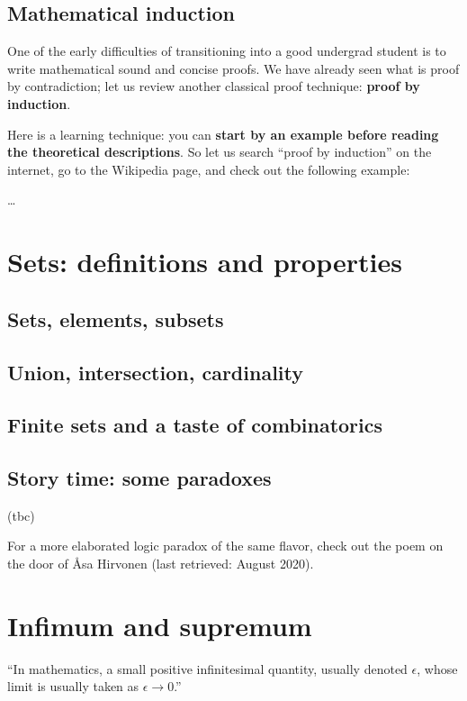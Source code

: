 \documentclass[
	fontsize=10pt, %
	twoside=true, %
	secnumdepth=1, %
	numbers=noenddot, %
]{kaobook}
\begin{document}
\section{Mathematical induction}
One of the early difficulties of transitioning into a good undergrad student is to write mathematical sound and concise proofs. We have already seen what is proof by contradiction; let us review another classical proof technique: \textbf{proof by induction}.

Here is a learning technique: you can \textbf{start by an example before reading the theoretical descriptions}. So let us search ``proof by induction'' on the internet, go to the Wikipedia page, and check out the following example:

\begin{example}
\dots
\end{example}


\chapter{Sets: definitions and properties}

\section{Sets, elements, subsets}

\section{Union, intersection, cardinality}

\section{Finite sets and a taste of combinatorics}

\section{Story time: some paradoxes}

(tbc)

For a more elaborated logic paradox of the same flavor, check out the poem on the door of Åsa Hirvonen (last retrieved: August 2020).

\chapter{Infimum and supremum}
``In mathematics, a small positive infinitesimal quantity, usually denoted $\epsilon$, whose limit is usually taken as $\epsilon\to 0$.''
\end{document}
